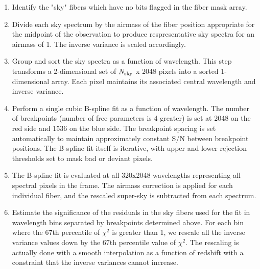 \documentclass[12pt,preprint]{aastex}
\begin{document}
\begin{enumerate}

\item{Identify the "sky" fibers which have no bits flagged 
in the fiber mask array.}

\item{Divide each sky spectrum by the airmass of the fiber position appropriate
for the midpoint of the observation to produce respresentative sky spectra for 
an airmass of 1.  The inverse variance is scaled accordingly.}

\item{Group and sort the sky spectra as a function of wavelength.  This step
transforms a 2-dimensional set of $N_{\rm sky}$ x 2048 pixels into a sorted 1-dimensional array.  
Each pixel maintains its associated central wavelength and inverse variance. }

\item{Perform a single cubic B-spline fit as a function of wavelength.  
The number of breakpoints (number of free parameters is 4 greater) is set 
at 2048 on the red side and 1536 on the blue side.  The breakpoint spacing 
is set automatically to maintain approximately constant S/N between breakpoint 
positions. The B-spline fit itself is iterative, with upper and lower rejection 
thresholds set to mask bad or deviant pixels. }

\item{The B-spline fit is evaluated at all 320x2048 wavelengths representing all
spectral pixels in the frame.  The airmass correction is applied for each individual 
fiber, and the rescaled super-sky is subtracted from each spectrum.}

\item{Estimate the significance of the residuals in the sky fibers used for the
fit in wavelength bins separated by breakpoints determined above.  For each bin
where the 67th percentile of $\chi^2$ is greater than 1, we rescale 
all the inverse variance values down by the 67th percentile value of $\chi^2$.
The rescaling is actually done with a smooth interpolation as a function of 
redshift with a constraint that the inverse variances cannot increase. }

\end{enumerate}

\end{document}
